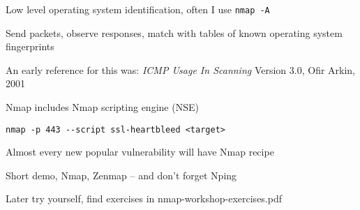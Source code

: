\documentclass[Screen16to9,17pt]{foils}
\begin{document}
\begin{list2}
\item Low level operating system identification, often I use \verb+nmap -A+
\item Send packets, observe responses, match with tables of known operating system fingerprints
\item An early reference for this was: \emph{ICMP Usage In Scanning} Version 3.0,
  Ofir Arkin, 2001 %
\end{list2}



Nmap includes Nmap scripting engine (NSE)


\begin{list1}
\item \verb+nmap -p 443 --script ssl-heartbleed <target>+\\
\item Almost every new popular vulnerability will have Nmap recipe
\end{list1}



\begin{list2}
\item Short demo, Nmap, Zenmap -- and don't forget Nping
\item Later try yourself, find exercises in nmap-workshop-exercises.pdf
\end{list2}

\end{document}
